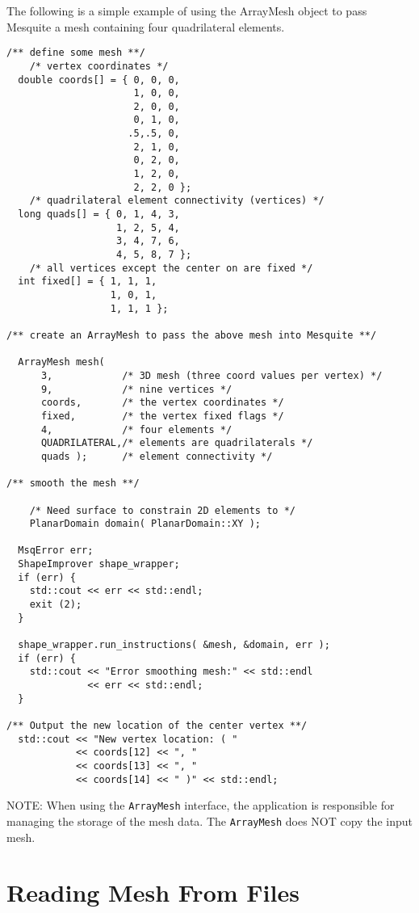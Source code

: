 The following is a simple example of using the ArrayMesh object to pass
Mesquite a mesh containing four quadrilateral elements.
\begin{verbatim}
/** define some mesh **/
    /* vertex coordinates */
  double coords[] = { 0, 0, 0,
                      1, 0, 0,
                      2, 0, 0,
                      0, 1, 0,
                     .5,.5, 0,
                      2, 1, 0,
                      0, 2, 0,
                      1, 2, 0,
                      2, 2, 0 };
    /* quadrilateral element connectivity (vertices) */
  long quads[] = { 0, 1, 4, 3,
                   1, 2, 5, 4,
                   3, 4, 7, 6,
                   4, 5, 8, 7 };
    /* all vertices except the center on are fixed */
  int fixed[] = { 1, 1, 1,
                  1, 0, 1,
                  1, 1, 1 };
  
/** create an ArrayMesh to pass the above mesh into Mesquite **/
  
  ArrayMesh mesh( 
      3,            /* 3D mesh (three coord values per vertex) */
      9,            /* nine vertices */
      coords,       /* the vertex coordinates */ 
      fixed,        /* the vertex fixed flags */
      4,            /* four elements */
      QUADRILATERAL,/* elements are quadrilaterals */
      quads );      /* element connectivity */
  
/** smooth the mesh **/
  
    /* Need surface to constrain 2D elements to */
    PlanarDomain domain( PlanarDomain::XY );

  MsqError err;
  ShapeImprover shape_wrapper;
  if (err) {
    std::cout << err << std::endl;
    exit (2);
  }
  
  shape_wrapper.run_instructions( &mesh, &domain, err );
  if (err) {
    std::cout << "Error smoothing mesh:" << std::endl
              << err << std::endl;
  }
  
/** Output the new location of the center vertex **/
  std::cout << "New vertex location: ( "
            << coords[12] << ", " 
            << coords[13] << ", " 
            << coords[14] << " )" << std::endl;
\end{verbatim}

NOTE:  When using the \texttt{ArrayMesh} interface, the application is responsible for managing the storage of the mesh data.  The \texttt{ArrayMesh}
 does NOT copy the input mesh.  

 
\section{Reading Mesh From Files} \label{sec:meshFiles}

